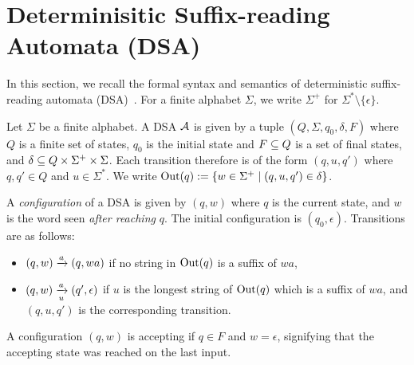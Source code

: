\newcommand{\lt}{\ell}
\newcommand{\rt}{r}

\section{Determinisitic Suffix-reading Automata (DSA)}

In this section, we recall the formal syntax and semantics of deterministic suffix-reading automata (DSA)~\cite{DBLP:journals/corr/abs-2410-22761}. For a finite alphabet $\Sigma$, we write $\Sigma^+$ for $\Sigma^* \setminus \{\epsilon\}$. %

\begin{definition}
Let $\Sigma$ be a finite alphabet. A DSA $\mathcal{A}$ is given by a tuple $(Q, \Sigma, q_0, \delta, F)$ where $Q$ is a finite set of states, $q_0$ is the initial state and $F \subseteq Q$ is a set of final states, and $\delta \subseteq Q \times \Sigma^+ \times \Sigma$. Each transition therefore is of the form $(q, u, q')$ where $q, q' \in Q$ and $u \in \Sigma^*$. We write $\operatorname{Out}(q) := \{ w \in \Sigma^+ \mid (q, u, q') \in \delta \}$.
\end{definition}

A \emph{configuration} of a DSA is given by $(q, w)$ where $q$ is the current state, and $w$ is the word seen \emph{after reaching} $q$. The initial configuration is $(q_0, \epsilon)$. Transitions are as follows:
\begin{itemize}
\item $(q, w) \xrightarrow{a} (q, wa)$ if no string in $\operatorname{Out}(q)$ is a suffix of $wa$,
\item $(q, w) \xrightarrow[u]{a} (q', \epsilon)$ if $u$ is the longest string of $\operatorname{Out}(q)$ which is a suffix of $wa$, and $(q, u, q')$ is the corresponding transition. 
\end{itemize}
A configuration $(q, w)$ is accepting if $q \in F$ and $w = \epsilon$, signifying that the accepting state was reached on the last input.


